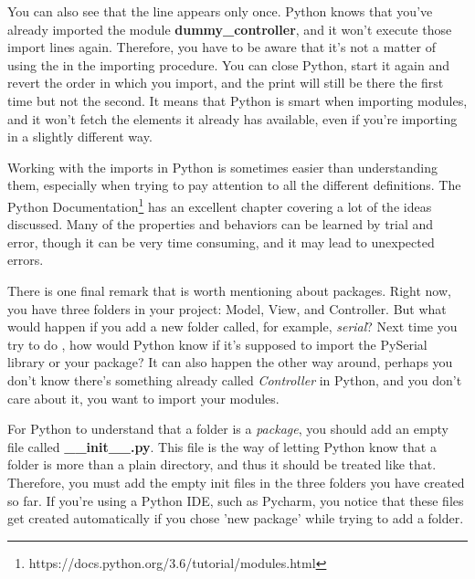 \sloppy You can also see that the line  appears only once. Python knows that you've already imported the module \textbf{dummy\_controller}, and it won't execute those import lines again. Therefore, you have to be aware that it's not a matter of using the  in the importing procedure. You can close Python, start it again and revert the order in which you import, and the print will still be there the first time but not the second. It means that Python is smart when importing modules, and it won't fetch the elements it already has available, even if you're importing in a slightly different way.


Working with the imports in Python is sometimes easier than understanding them, especially when trying to pay attention to all the different definitions. The Python Documentation\footnote{https://docs.python.org/3.6/tutorial/modules.html} has an excellent chapter covering a lot of the ideas discussed. Many of the properties and behaviors can be learned by trial and error, though it can be very time consuming, and it may lead to unexpected errors.

There is one final remark that is worth mentioning about packages. Right now, you have three folders in your project: Model, View, and Controller. But what would happen if you add a new folder called, for example, \emph{serial}? Next time you try to do , how would Python know if it's supposed to import the PySerial library or your package? It can also happen the other way around, perhaps you don't know there's something already called \emph{Controller} in Python, and you don't care about it, you want to import your modules.

For Python to understand that a folder is a \emph{package}, you should add an empty file called \textbf{\_\_init\_\_.py}. This file is the way of letting Python know that a folder is more than a plain directory, and thus it should be treated like that. Therefore, you must add the empty init files in the three folders you have created so far. If you're using a Python IDE, such as Pycharm, you notice that these files get created automatically if you chose 'new package' while trying to add a folder.

